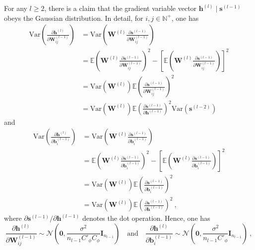 \documentclass[review,10pt]{JMtemplate}
\begin{document}
For any $l \geq 2$, there is a claim that the gradient variable vector $\boldsymbol{h}^{(l)} \mid \boldsymbol{s}^{(l-1)}$ obeys the Gaussian distribution. In detail, for $i,j \in \mathbb{N}^+$, one has
\[
\begin{aligned}
	\textrm{Var} \left( \frac{\partial \boldsymbol{h}^{(l)}}{\partial \mathbf{W}_{ij}^{(l-1)}} \right) 
	&= \textrm{Var} \left( \mathbf{W}^{(l)} \frac{\partial \boldsymbol{s}^{(l-1)}}{\partial \mathbf{W}_{ij}^{(l-1)}} \right)  \\
	&= \mathbb{E} \left( \mathbf{W}^{(l)} \frac{\partial \boldsymbol{s}^{(l-1)}}{\partial \mathbf{W}_{ij}^{(l-1)}} \right)^2 - \left[ \mathbb{E} \left( \mathbf{W}^{(l)} \frac{\partial \boldsymbol{s}^{(l-1)}}{\partial \mathbf{W}_{ij}^{(l-1)}} \right) \right]^2  \\
	&= \textrm{Var} \left( \mathbf{W}^{(l)} \right) \mathbb{E} \left( \frac{\partial \boldsymbol{s}^{(l-1)}}{\partial \mathbf{W}_{ij}^{(l-1)}} \right)^2 \\
	&= \textrm{Var} \left( \mathbf{W}^{(l)} \right) \mathbb{E} \left( \frac{\partial \boldsymbol{s}^{(l-1)}}{\partial \boldsymbol{h}^{(l-1)}} \right)^2 \textrm{Var} \left(  \boldsymbol{s}^{(l-2)} \right) 
\end{aligned}
\]
and 
\[
\begin{aligned}
	\textrm{Var} \left( \frac{\partial \boldsymbol{h}^{(l)}}{\partial \boldsymbol{b}_i^{(l-1)}} \right) 
	&= \textrm{Var} \left( \mathbf{W}^{(l)} \frac{\partial \boldsymbol{s}^{(l-1)}}{\partial \boldsymbol{b}_i^{(l-1)}} \right)  \\
	&= \mathbb{E} \left( \mathbf{W}^{(l)} \frac{\partial \boldsymbol{s}^{(l-1)}}{\partial \boldsymbol{b}_i^{(l-1)}} \right)^2 - \left[ \mathbb{E} \left( \mathbf{W}^{(l)} \frac{\partial \boldsymbol{s}^{(l-1)}}{\partial \boldsymbol{b}_i^{(l-1)}} \right) \right]^2 \\
	&= \textrm{Var} \left( \mathbf{W}^{(l)} \right) \mathbb{E} \left( \frac{\partial \boldsymbol{s}^{(l-1)}}{\partial \boldsymbol{b}_i^{(l-1)}} \right)^2 \\
	&= \textrm{Var} \left( \mathbf{W}^{(l)} \right) \mathbb{E} \left( \frac{\partial \boldsymbol{s}^{(l-1)}}{\partial \boldsymbol{h}^{(l-1)}} \right)^2  \ ,
\end{aligned}
\]
where ${\partial \boldsymbol{s}^{(l-1)}} / {\partial \boldsymbol{h}^{(l-1)}}$ denotes the dot operation. Hence, one has
\[
\frac{\partial \boldsymbol{h}^{(l)}}{\partial \mathbf{W}_{ij}^{(l-1)}} \sim \mathcal{N} \left(  \boldsymbol{0}, \frac{\sigma^2}{n_{l-1} C'_{\phi} C_{\phi} } \mathbf{I}_{n_{l-1}} \right) 
\quad\text{and}\quad
\frac{\partial \boldsymbol{h}^{(l)}}{\partial \boldsymbol{b}_i^{(l-1)}} \sim \mathcal{N} \left(  \boldsymbol{0}, \frac{\sigma^2}{n_{l-1} C'_{\phi} } \mathbf{I}_{n_{l-1}} \right) \ ,
\]
\end{document}
